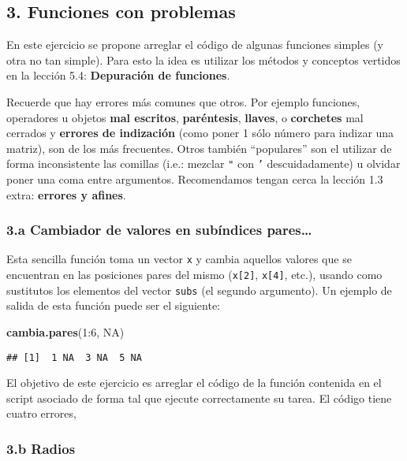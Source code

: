 \documentclass[]{article}
\newenvironment{Shaded}{}{}
\newcommand{\KeywordTok}[1]{\textcolor[rgb]{0.00,0.44,0.13}{\textbf{{#1}}}}
\newcommand{\DecValTok}[1]{\textcolor[rgb]{0.25,0.63,0.44}{{#1}}}
\newcommand{\OtherTok}[1]{\textcolor[rgb]{0.00,0.44,0.13}{{#1}}}
\newcommand{\NormalTok}[1]{{#1}}
\begin{document}
\subsection{3. Funciones con problemas}

En este ejercicio se propone arreglar el código de algunas funciones
simples (y otra no tan simple). Para esto la idea es utilizar los
métodos y conceptos vertidos en la lección 5.4: \textbf{Depuración de
funciones}.

Recuerde que hay errores más comunes que otros. Por ejemplo funciones,
operadores u objetos \textbf{mal escritos}, \textbf{paréntesis},
\textbf{llaves}, o \textbf{corchetes} mal cerrados y \textbf{errores de
indización} (como poner 1 sólo número para indizar una matriz), son de
los más frecuentes. Otros también ``populares'' son el utilizar de forma
inconsistente las comillas (i.e.: mezclar \texttt{"} con \texttt{'}
descuidadamente) u olvidar poner una coma entre argumentos. Recomendamos
tengan cerca la lección 1.3 extra: \textbf{errores y afines}.

\subsubsection{3.a Cambiador de valores en subíndices pares\ldots{}}

Esta sencilla función toma un vector \texttt{x} y cambia aquellos
valores que se encuentran en las posiciones pares del mismo
(\texttt{x{[}2{]}}, \texttt{x{[}4{]}}, etc.), usando como sustitutos los
elementos del vector \texttt{subs} (el segundo argumento). Un ejemplo de
salida de esta función puede ser el siguiente:

\begin{Shaded}
\begin{Highlighting}[]
\KeywordTok{cambia.pares}\NormalTok{(}\DecValTok{1}\NormalTok{:}\DecValTok{6}\NormalTok{, }\OtherTok{NA}\NormalTok{)}
\end{Highlighting}
\end{Shaded}

\begin{verbatim}
## [1]  1 NA  3 NA  5 NA
\end{verbatim}

El objetivo de este ejercicio es arreglar el código de la función
contenida en el script asociado de forma tal que ejecute correctamente
su tarea. El código tiene cuatro errores,

\subsubsection{3.b Radios}
\end{document}
